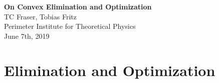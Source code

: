 \documentclass[10pt]{article}
\theoremstyle{definition}
\theoremstyle{remark}
\begin{document}
\begin{center}
    \large{\textbf{On Convex Elimination and Optimization}} \\
    \normalsize{TC Fraser, Tobias Fritz} \\
    \normalsize{Perimeter Institute for Theoretical Physics} \\
    \normalsize{June 7th, 2019}
\end{center}

\newcommand{\catA}{\mathscr{A}}
\newcommand{\catB}{\mathscr{B}}
\newcommand{\catC}{\mathscr{C}}
\newcommand{\catD}{\mathscr{D}}
\newcommand{\catE}{\mathscr{E}}

\section{Elimination and Optimization}
\end{document}
